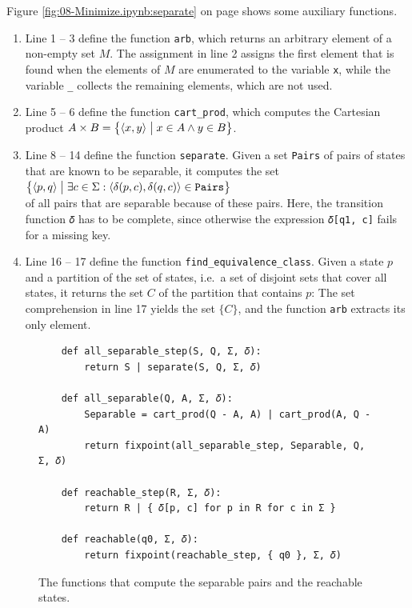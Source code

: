 \noindent
Figure \ref{fig:08-Minimize.ipynb:separate} on page \pageref{fig:08-Minimize.ipynb:separate} shows some auxiliary
functions.
\begin{enumerate}
\item Line 1 -- 3 define the function \texttt{arb}, which returns an arbitrary element of a non-empty set $M$.
      The assignment in line 2 assigns the first element that is found when the elements of $M$ are enumerated to
      the variable \texttt{x}, while the variable \texttt{\_} collects the remaining elements, which are not
      used.
\item Line 5 -- 6 define the function \texttt{cart\_prod}, which computes the Cartesian product
      $A \times B = \bigl\{ \pair(x, y) \bigm| x \in A \wedge y \in B \bigr\}$.
\item Line 8 -- 14 define the function \texttt{separate}.  Given a set \texttt{Pairs} of pairs of states that are
      known to be separable, it computes the set
      \\[0.2cm]
      \hspace*{1.3cm}
      $\bigl\{ \pair(p,q) \bigm| \exists c \in \Sigma: \langle \delta(p,c), \delta(q,c) \rangle \in \texttt{Pairs}
      \bigr\}$
      \\[0.2cm]
      of all pairs that are separable because of these pairs.  Here, the transition function \texttt{𝛿} has to
      be complete, since otherwise the expression \texttt{𝛿[q1, c]} fails for a missing key.
\item Line 16 -- 17 define the function \texttt{find\_equivalence\_class}.  Given a state $p$ and a partition of
      the set of states, i.e.~a set of disjoint sets that cover all states, it returns the set $C$ of the
      partition that contains $p$:  The set comprehension in line 17 yields the set $\{ C \}$, and the function
      \texttt{arb} extracts its only element.
\end{enumerate}

\begin{figure}[!ht]
\centering
\begin{verbatim}
    def all_separable_step(S, Q, Σ, 𝛿):
        return S | separate(S, Q, Σ, 𝛿)

    def all_separable(Q, A, Σ, 𝛿):
        Separable = cart_prod(Q - A, A) | cart_prod(A, Q - A)
        return fixpoint(all_separable_step, Separable, Q, Σ, 𝛿)

    def reachable_step(R, Σ, 𝛿):
        return R | { 𝛿[p, c] for p in R for c in Σ }

    def reachable(q0, Σ, 𝛿):
        return fixpoint(reachable_step, { q0 }, Σ, 𝛿)
\end{verbatim}
\vspace*{-0.3cm}
\caption{The functions that compute the separable pairs and the reachable states.}
\label{fig:08-Minimize.ipynb:all_separable}
\end{figure}

